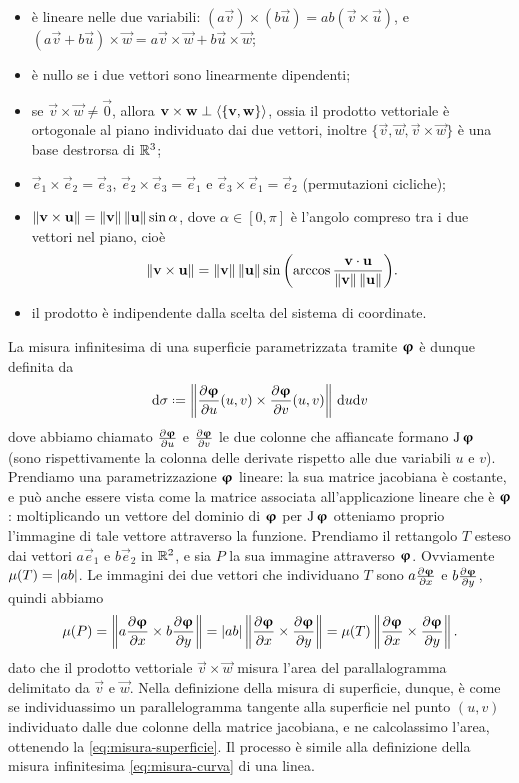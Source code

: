 \begin{itemize}
	\item è lineare nelle due variabili: $(a\vec v)\times(b\vec u)=ab(\vec v\times\vec u)$, e $(a\vec v+b\vec u)\times\vec w=a\vec v\times\vec w+b\vec u\times\vec w$;
	\item è nullo se i due vettori sono linearmente dipendenti;
	\item se $\vec v\times\vec w\neq\vec 0$, allora $\mathbf{v}\times\mathbf{w}\perp\left\langle{\{\mathbf{v},\mathbf{w}\}}\right\rangle$, ossia il prodotto vettoriale è ortogonale al piano individuato dai due vettori, inoltre $\{\vec v,\vec w,\vec v\times\vec w\}$ è una base destrorsa di $\mathbb{R}^3$;
	\item $\vec e_1\times\vec e_2=\vec e_3$, $\vec e_2\times\vec e_3=\vec e_1$ e $\vec e_3\times\vec e_1=\vec e_2$ (permutazioni cicliche);
	\item $\left\|{\mathbf{v}\times\mathbf{u}}\right\|=\left\|{\mathbf{v}}\right\|\left\|{\mathbf{u}}\right\|\sin\alpha$, dove $\alpha\in[0,\pi]$ è l'angolo compreso tra i due vettori nel piano, cioè
		\begin{equation}
			\left\|{\mathbf{v}\times\mathbf{u}}\right\|=\left\|{\mathbf{v}}\right\|\left\|{\mathbf{u}}\right\|\sin\bigg(\!\arccos\frac{{\mathbf{v}}\cdot{\mathbf{u}}}{\left\|{\mathbf{v}}\right\|\left\|{\mathbf{u}}\right\|}\bigg).
		\end{equation}
	\item il prodotto è indipendente dalla scelta del sistema di coordinate.
\end{itemize}

La misura infinitesima di una superficie parametrizzata tramite $\bm{\upvarphi}$ è dunque definita da
\begin{equation}
	\dd\sigma\defeq\norm{\drp{\vphi}{u}(u,v)\times\drp{\vphi}{v}(u,v)}\,\dd u\dd v
	\label{eq:misura-superficie}
\end{equation}
dove abbiamo chiamato $\frac{\partial {\bm{\upvarphi}}}{\partial {u}}$ e $\frac{\partial {\bm{\upvarphi}}}{\partial {v}}$ le due colonne che affiancate formano $\operatorname{J}\bm{\upvarphi}$ (sono rispettivamente la colonna delle derivate rispetto alle due variabili $u$ e $v$).
Prendiamo una parametrizzazione $\bm{\upvarphi}$ lineare: la sua matrice jacobiana è costante, e può anche essere vista come la matrice associata all'applicazione lineare che è $\bm{\upvarphi}$: moltiplicando un vettore del dominio di $\bm{\upvarphi}$ per $\operatorname{J}{\bm{\upvarphi}}$ otteniamo proprio l'immagine di tale vettore attraverso la funzione.
Prendiamo il rettangolo $T$ esteso dai vettori $a\vec e_1$ e $b\vec e_2$ in $\mathbb{R}^2$, e sia $P$ la sua immagine attraverso $\bm{\upvarphi}$.
Ovviamente $\mu(T)=\left|{ab}\right|$.
Le immagini dei due vettori che individuano $T$ sono $a\frac{\partial {\bm{\upvarphi}}}{\partial {x}}$ e $b\frac{\partial {\bm{\upvarphi}}}{\partial {y}}$, quindi abbiamo
\begin{equation*}
	\mu(P)=\left\|{a\frac{\partial {\bm{\upvarphi}}}{\partial {x}}\times b\frac{\partial {\bm{\upvarphi}}}{\partial {y}}}\right\|=\left|{ab}\right|\left\|{\frac{\partial {\bm{\upvarphi}}}{\partial {x}}\times\frac{\partial {\bm{\upvarphi}}}{\partial {y}}}\right\|=\mu(T)\left\|{\frac{\partial {\bm{\upvarphi}}}{\partial {x}}\times\frac{\partial {\bm{\upvarphi}}}{\partial {y}}}\right\|.
\end{equation*}
dato che il prodotto vettoriale $\vec v\times\vec w$ misura l'area del parallalogramma delimitato da $\vec v$ e $\vec w$.
Nella definizione della misura di superficie, dunque, è come se individuassimo un parallelogramma tangente alla superficie nel punto $(u,v)$ individuato dalle due colonne della matrice jacobiana, e ne calcolassimo l'area, ottenendo la \eqref{eq:misura-superficie}.
Il processo è simile alla definizione della misura infinitesima \eqref{eq:misura-curva} di una linea.

